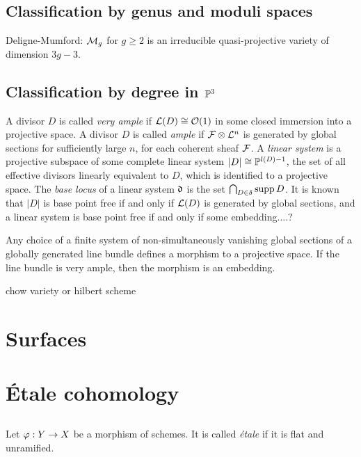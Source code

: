 \documentclass{../../large}
\begin{document}
\section{Classification by genus and moduli spaces}
Deligne-Mumford: $\cM_g$ for $g\ge2$ is an irreducible quasi-projective variety of dimension $3g-3$.

\section{Classification by degree in $\P^3$}

A divisor $D$ is called \emph{very ample} if $\cL(D)\cong\cO(1)$ in some closed immersion into a projective space.
A divisor $D$ is called \emph{ample} if $\cF\otimes\cL^n$ is generated by global sections for sufficiently large $n$, for each coherent sheaf $\cF$.
A \emph{linear system} is a projective subspace of some complete linear system $|D|\cong\P^{l(D)-1}$, the set of all effective divisors linearly equivalent to $D$, which is identified to a projective space.
The \emph{base locus} of a linear system $\fd$ is the set $\bigcap_{D\in\delta}\supp D$.
It is known that $|D|$ is base point free if and only if $\cL(D)$ is generated by global sections, and a linear system is base point free if and only if some embedding....?

Any choice of a finite system of non-simultaneously vanishing global sections of a globally generated line bundle defines a morphism to a projective space.
If the line bundle is very ample, then the morphism is an embedding.

chow variety or hilbert scheme


\chapter{Surfaces}




\chapter{\'Etale cohomology}

\section{}

\begin{prb}
Let $\f:Y\to X$ be a morphism of schemes.
It is called \emph{\'etale} if it is flat and unramified.
\end{prb}
\end{document}

